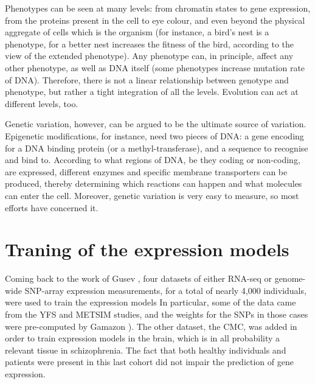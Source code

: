 \documentclass[../main.tex]{subfiles}
\begin{document}
Phenotypes can be seen at many levels: from chromatin states to gene 
expression, from the proteins present in the cell to eye colour, and 
even beyond the physical aggregate of cells which is the organism (for 
instance, a bird's nest is a phenotype, for a better nest increases the 
fitness of the bird, according to the view of the extended 
phenotype\autocite{Dawkins1999}). Any phenotype can, in principle, 
affect any other phenotype, as well as DNA itself (\eg some phenotypes 
increase mutation rate of DNA). Therefore, there is not a linear 
relationship between genotype and phenotype, but rather a tight 
integration of all the levels. Evolution can act at different levels, 
too.

Genetic variation, however, can be argued to be the ultimate source of 
variation. Epigenetic modifications, for instance, need two pieces of 
DNA: a gene encoding for a DNA binding protein (or a 
methyl-transferase), and a sequence to recognise and bind to. According 
to what regions of DNA, be they coding or non-coding, are expressed, 
different enzymes and specific membrane transporters can be produced, 
thereby determining which reactions can happen and what molecules can 
enter the cell\autocite{Alberts2014}. Moreover, genetic variation is very 
easy to measure, so most efforts have concerned it.

\section{Traning of the expression models}

Coming back to the work of Gusev \etal, four datasets of either RNA-seq 
or genome-wide SNP-array expression measurements, for a total of nearly 
4,000 individuals,  were used to train the expression 
models In particular, some 
of the data came from the YFS and METSIM studies, and the weights for 
the SNPs in those cases were pre-computed by Gamazon ). The 
other dataset, the CMC, was added in order to train expression models in 
the brain, which is in all probability a relevant tissue in 
schizophrenia. The fact that both healthy individuals and patients were 
present in this last cohort did not impair the prediction of gene 
expression.
\end{document}
